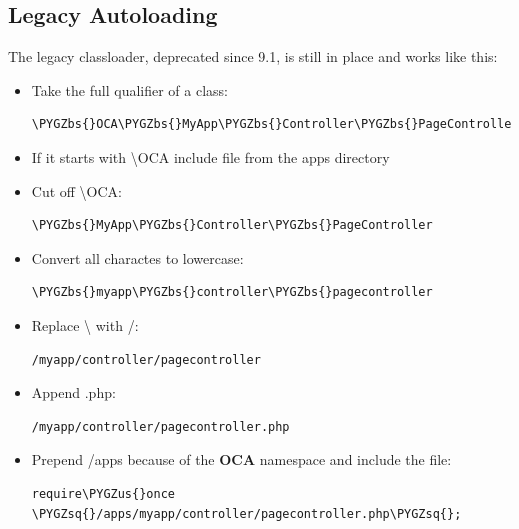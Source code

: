 \documentclass[letterpaper,10pt,english]{sphinxmanual}
\def\PYGZbs{\char`\\}
\def\PYGZus{\char`\_}
\def\PYGZsq{\char`\'}
\begin{document}
\subsection{Legacy Autoloading}
\label{app/classloader:legacy-autoloading}
The legacy classloader, deprecated since 9.1, is still in place and works like this:
\begin{itemize}
\item {} 
Take the full qualifier of a class:

\begin{Verbatim}[commandchars=\\\{\}]
\PYGZbs{}OCA\PYGZbs{}MyApp\PYGZbs{}Controller\PYGZbs{}PageController
\end{Verbatim}

\item {} 
If it starts with \textbackslash{}OCA include file from the apps directory

\item {} 
Cut off \textbackslash{}OCA:

\begin{Verbatim}[commandchars=\\\{\}]
\PYGZbs{}MyApp\PYGZbs{}Controller\PYGZbs{}PageController
\end{Verbatim}

\item {} 
Convert all charactes to lowercase:

\begin{Verbatim}[commandchars=\\\{\}]
\PYGZbs{}myapp\PYGZbs{}controller\PYGZbs{}pagecontroller
\end{Verbatim}

\item {} 
Replace \textbackslash{} with /:

\begin{Verbatim}[commandchars=\\\{\}]
/myapp/controller/pagecontroller
\end{Verbatim}

\item {} 
Append .php:

\begin{Verbatim}[commandchars=\\\{\}]
/myapp/controller/pagecontroller.php
\end{Verbatim}

\item {} 
Prepend /apps because of the \textbf{OCA} namespace and include the file:

\begin{Verbatim}[commandchars=\\\{\}]
require\PYGZus{}once \PYGZsq{}/apps/myapp/controller/pagecontroller.php\PYGZsq{};
\end{Verbatim}

\end{itemize}
\end{document}
